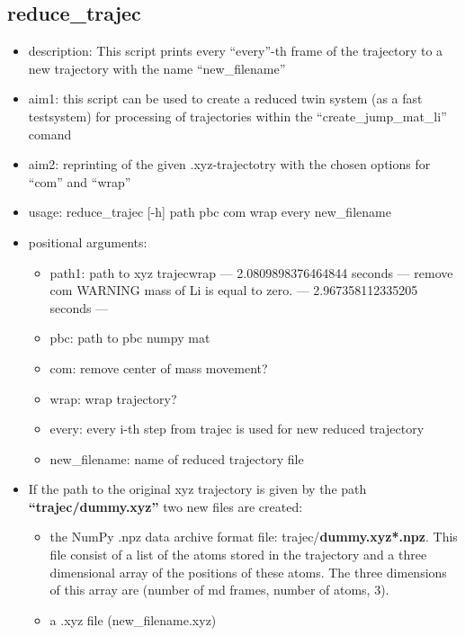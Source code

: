 \documentclass{article}
\begin{document}
\subsection{reduce\_trajec}

\begin{itemize}
\item description: This script prints every ``every''-th frame of the trajectory to a new trajectory with the name  ``new\_filename''
\item aim1: this script can be used to create a reduced twin system (as a fast testsystem) for  processing of trajectories within the  ``create\_jump\_mat\_li'' comand
\item aim2: reprinting of the given .xyz-trajectotry with the chosen options for ``com'' and ``wrap''

%
%
\item usage: reduce\_trajec [-h] path  pbc com wrap every new\_filename
%

 \item  positional arguments:
 \begin{itemize}
 \item  path1:          path to xyz trajecwrap
--- 2.0809898376464844 seconds ---
remove com
WARNING mass of Li is equal to zero.
--- 2.967358112335205 seconds ---
%
 \item pbc:            path to pbc numpy mat
 \item com:            remove center of mass movement?
 \item wrap:           wrap trajectory?
  \item  every:        every i-th step from trajec is used for  new reduced trajectory
  \item new\_filename:  name of reduced trajectory file
%
%
%
%
%
%
\end{itemize}
 \item If the path to the original xyz trajectory is given by the path \textbf{``trajec/dummy.xyz''}  two new files are created:
\begin{itemize}
 \item the  NumPy .npz data archive format file: trajec/\textbf{dummy.xyz*.npz}. This file consist of a list of the atoms  stored in the trajectory and a three dimensional array of the positions of these atoms. The three dimensions of this array are    (number of md frames, number of atoms, 3).
 \item a .xyz file  (new\_filename.xyz)
\end{itemize}


\end{itemize}
\end{document}
